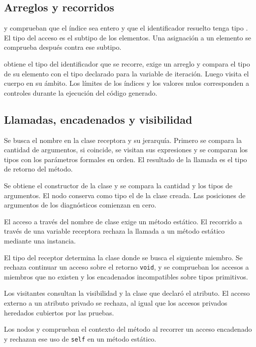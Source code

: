 \subsection{Arreglos y recorridos}
 y  comprueban que el
índice sea entero y que el identificador resuelto tenga tipo
. El tipo del acceso es el subtipo de los elementos.
Una asignación a un elemento se comprueba después contra ese subtipo.

 obtiene el tipo del identificador que se
recorre, exige un arreglo y compara el tipo de su elemento con el tipo
declarado para la variable de iteración. Luego visita el cuerpo en su
ámbito. Los límites de los índices y los valores nulos corresponden
a controles durante la ejecución del código generado.

\subsection{Llamadas, encadenados y visibilidad}
\begin{description}[style=nextline]
  \item[Llamada a método]
  Se busca el nombre en la clase receptora y su jerarquía. Primero se
  compara la cantidad de argumentos, si coincide, se visitan sus
  expresiones y se comparan los tipos con los parámetros formales en
  orden. El resultado de la llamada es el tipo de retorno del método.
  \item[Llamada a constructor]
  Se obtiene el constructor de la clase y se compara la cantidad y los
  tipos de argumentos. El nodo conserva como tipo el de la clase creada.
  Las posiciones de argumentos de los diagnósticos comienzan en cero.
  \item[Acceso estático o de instancia]
  El acceso a través del nombre de clase exige un método estático.
  El recorrido a través de una variable receptora rechaza la llamada
  a un método estático mediante una instancia.
  \item[Encadenado]
  El tipo del receptor determina la clase donde se busca el siguiente
  miembro. Se rechaza continuar un acceso sobre el retorno
  \texttt{void}, y se comprueban los accesos a miembros que no existen
  y los encadenados incompatibles sobre tipos primitivos.
  \item[Atributo público o privado]
  Los visitantes consultan la visibilidad y la clase que declaró el
  atributo. El acceso externo a un atributo privado se rechaza, al igual
  que los accesos privados heredados cubiertos por las pruebas.
  \item[Uso de self]
  Los nodos  y  comprueban
  el contexto del método al recorrer un acceso encadenado y rechazan
  ese uso de \texttt{self} en un método estático.
\end{description}

